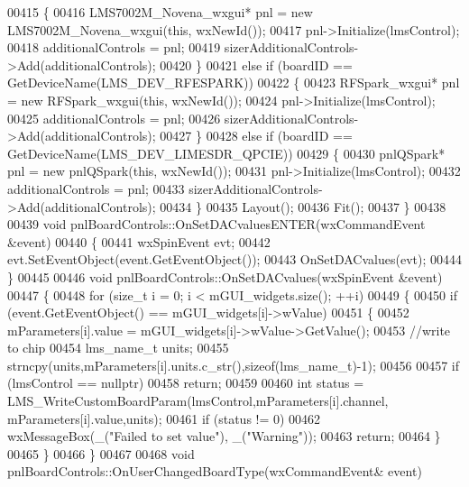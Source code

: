 \begin{DoxyCode}
{{{{00415     \{
00416         LMS7002M_Novena_wxgui* pnl = \textcolor{keyword}{new} LMS7002M_Novena_wxgui(\textcolor{keyword}{this}, wxNewId());
00417         pnl->Initialize(lmsControl);
00418         additionalControls = pnl;
00419         sizerAdditionalControls->Add(additionalControls);
00420     \}
00421     \textcolor{keywordflow}{else} \textcolor{keywordflow}{if} (boardID == GetDeviceName(LMS_DEV_RFESPARK))
00422     \{
00423         RFSpark_wxgui* pnl = \textcolor{keyword}{new} RFSpark_wxgui(\textcolor{keyword}{this}, wxNewId());
00424         pnl->Initialize(lmsControl);
00425         additionalControls = pnl;
00426         sizerAdditionalControls->Add(additionalControls);
00427     \}
00428     \textcolor{keywordflow}{else} \textcolor{keywordflow}{if} (boardID == GetDeviceName(LMS_DEV_LIMESDR_QPCIE))
00429     \{
00430         pnlQSpark* pnl = \textcolor{keyword}{new} pnlQSpark(\textcolor{keyword}{this}, wxNewId());
00431         pnl->Initialize(lmsControl);
00432         additionalControls = pnl;
00433         sizerAdditionalControls->Add(additionalControls);
00434     \}
00435     Layout();
00436     Fit();
00437 \}
00438 
00439 \textcolor{keywordtype}{void} pnlBoardControls::OnSetDACvaluesENTER(wxCommandEvent &event)
00440 \{
00441     wxSpinEvent evt;
00442     evt.SetEventObject(event.GetEventObject());
00443     OnSetDACvalues(evt);
00444 \}
00445 
00446 \textcolor{keywordtype}{void} pnlBoardControls::OnSetDACvalues(wxSpinEvent &event)
00447 \{
00448     \textcolor{keywordflow}{for} (\textcolor{keywordtype}{size\_t} i = 0; i < mGUI_widgets.size(); ++i)
00449     \{
00450         \textcolor{keywordflow}{if} (event.GetEventObject() == mGUI_widgets[i]->wValue)
00451         \{
00452             mParameters[i].value = mGUI_widgets[i]->wValue->GetValue();
00453             \textcolor{comment}{//write to chip}
00454             lms_name_t units;
00455             strncpy(units,mParameters[i].units.c\_str(),\textcolor{keyword}{sizeof}(lms_name_t)-1);
00456 
00457             \textcolor{keywordflow}{if} (lmsControl == \textcolor{keyword}{nullptr})
00458                 \textcolor{keywordflow}{return};
00459 
00460             \textcolor{keywordtype}{int} status = LMS_WriteCustomBoardParam(lmsControl,mParameters[i].channel,
      mParameters[i].value,units);
00461             \textcolor{keywordflow}{if} (status != 0)
00462                 wxMessageBox(\_(\textcolor{stringliteral}{"Failed to set value"}), \_(\textcolor{stringliteral}{"Warning"}));
00463             \textcolor{keywordflow}{return};
00464         \}
00465     \}
00466 \}
00467 
00468 \textcolor{keywordtype}{void} pnlBoardControls::OnUserChangedBoardType(wxCommandEvent& event)
}}}}
\end{DoxyCode}
